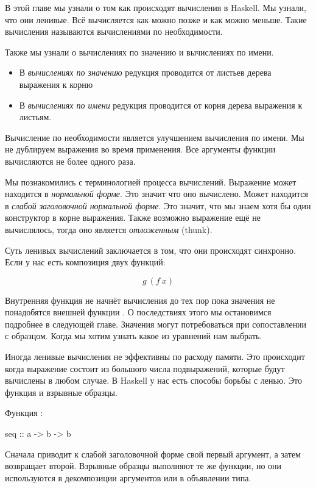 В этой главе мы узнали о том как происходят вычисления
в Haskell. Мы узнали, что они ленивые. Всё вычисляется
как можно позже и как можно меньше. Такие вычисления
называются вычислениями по необходимости.

Также мы узнали о вычислениях по значению и вычислениях по имени.

\begin{itemize}
\item В \emph{вычислениях по значению} редукция проводится от 
        листьев дерева выражения к корню
\item В \emph{вычислениях по имени} редукция проводится от корня 
        дерева выражения к листьям.
\end{itemize}

Вычисление по необходимости является улучшением 
вычисления по имени. Мы не дублируем выражения
во время применения. Все аргументы функции вычисляются
не более одного раза.

Мы познакомились с терминологией процесса вычислений.
Выражение может находится в \emph{нормальной форме}. Это значит
что оно вычислено. Может находится в \emph{слабой заголовочной
нормальной форме}. Это значит, что мы знаем хотя бы один 
конструктор в корне выражения. Также возможно выражение 
ещё не вычислялось, тогда оно является \emph{отложенным} (thunk).

Суть ленивых вычислений заключается в том, что они
происходят синхронно. Если у нас есть 
композиция двух функций:

\[ g\ (f\ x) \]

Внутренняя функция  не начнёт вычисления до тех
пор пока значения не понадобятся внешней функции .
О последствиях этого мы остановимся подробнее в следующей главе.
Значения могут потребоваться при сопоставлении с образцом.
Когда мы хотим узнать какое из уравнений нам выбрать.

Иногда ленивые вычисления не эффективны по расходу памяти. 
Это происходит когда выражение состоит из большого числа
подвыражений, которые будут вычислены в любом случае.
В Haskell у нас есть способы борьбы с ленью. 
Это функция  и взрывные образцы. 

Функция :

\begin{code}
seq :: a -> b -> b
\end{code}

Сначала приводит к слабой заголовочной форме свой первый
аргумент, а затем возвращает второй. Взрывные образцы
выполняют те же функции, но они используются в декомпозиции 
аргументов или в объявлении типа. 

